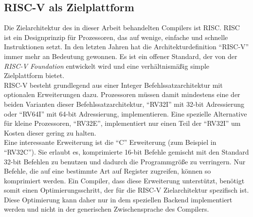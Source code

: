 \subsection{RISC-V als Zielplattform}

Die Zielarchitektur des in dieser Arbeit behandelten Compilers ist \acs{RISC}.
RISC ist ein Designprinzip für Prozessoren, das auf wenige, einfache und schnelle Instruktionen setzt.
In den letzten Jahren hat die Architekturdefinition ``RISC-V'' immer mehr an Bedeutung gewonnen.
Es ist ein offener Standard, der von der \textit{RISC-V Foundation} entwickelt wird und eine verhältnismäßig simple Zielplattform bietet\cite{RISCV}.\\

RISC-V besteht grundlegend aus einer Integer Befehlssatzarchitektur mit optionalen Erweiterungen dazu.
Prozessoren müssen damit mindestens eine der beiden Varianten dieser Befehlssatzarchitektur, ``RV32I'' mit 32-bit Adressierung oder ``RV64I'' mit 64-bit Adressierung, implementieren.
Eine spezielle Alternative für kleine Prozessoren, ``RV32E'', implementiert nur einen Teil der ``RV32I'' um Kosten dieser gering zu halten\cite{waterman:2017}.\\
Eine interessante Erweiterung ist die ``C'' Erweiterung (zum Beispiel in ``RV32C'').
Sie erlaubt es, komprimierte 16-bit Befehle gemischt mit den Standard 32-bit Befehlen zu benutzen und dadurch die Programmgröße zu verringern.
Nur Befehle, die auf eine bestimmte Art auf Register zugreifen, können so komprimiert werden.
Ein Compiler, dass diese Erweiterung unterstützt, benötigt somit einen Optimierungsschritt, der für die RISC-V Zielarchitektur spezifisch ist.
Diese Optimierung kann daher nur in dem speziellen Backend implementiert werden und nicht in der generischen Zwischensprache des Compilers.
